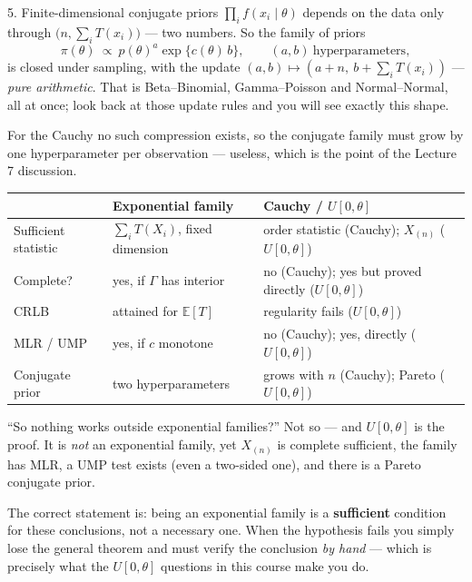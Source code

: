 \documentclass[11pt]{article}
\newcommand{\E}{\mathbb{E}}
\begin{document}
\begin{idea}{5. Finite-dimensional conjugate priors}
$\prod_if(x_i\mid\theta)$ depends on the data only through $\big(n,\sum_iT(x_i)\big)$ --- two
numbers. So the family of priors
\[
\pi(\theta)\ \propto\ p(\theta)^{a}\exp\{c(\theta)\,b\},\qquad (a,b)\ \text{hyperparameters},
\]
is closed under sampling, with the update $(a,b)\mapsto(a+n,\ b+\sum_iT(x_i))$ ---
\emph{pure arithmetic}. That is Beta--Binomial, Gamma--Poisson and Normal--Normal, all at
once; look back at those update rules and you will see exactly this shape.

For the Cauchy no such compression exists, so the conjugate family must grow by one
hyperparameter per observation --- useless, which is the point of the Lecture 7 discussion.
\end{idea}

\begin{center}
\renewcommand{\arraystretch}{1.4}
\begin{tabular}{@{}p{4.3cm}p{5.3cm}p{5.5cm}@{}}
\toprule
& \textbf{Exponential family} & \textbf{Cauchy / $U[0,\theta]$} \\
\midrule
Sufficient statistic & $\sum_iT(X_i)$, fixed dimension &
order statistic (Cauchy); $X_{(n)}$ ($U[0,\theta]$) \\
Complete? & yes, if $\Gamma$ has interior & no (Cauchy); yes but proved directly ($U[0,\theta]$) \\
CRLB & attained for $\E[T]$ & regularity fails ($U[0,\theta]$) \\
MLR / UMP & yes, if $c$ monotone & no (Cauchy); yes, directly ($U[0,\theta]$) \\
Conjugate prior & two hyperparameters & grows with $n$ (Cauchy); Pareto ($U[0,\theta]$) \\
\bottomrule
\end{tabular}
\end{center}

\begin{confusion}{``So nothing works outside exponential families?''}
Not so --- and $U[0,\theta]$ is the proof. It is \emph{not} an exponential family, yet
$X_{(n)}$ is complete sufficient, the family has MLR, a UMP test exists (even a two-sided
one), and there is a Pareto conjugate prior.

The correct statement is: being an exponential family is a \textbf{sufficient} condition for
these conclusions, not a necessary one. When the hypothesis fails you simply lose the general
theorem and must verify the conclusion \emph{by hand} --- which is precisely what the
$U[0,\theta]$ questions in this course make you do.
\end{confusion}
\end{document}

